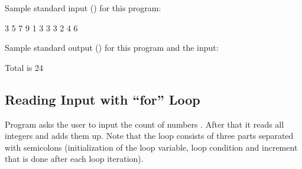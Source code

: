 \documentclass[letterpaper,10pt,english,openany,oneside]{sphinxmanual}
\begin{document}
%
\begin{sphinxVerbatim}[commandchars=\\\{\}]
 
 
 

  
 
     
     
          
            
           
          
     
\end{sphinxVerbatim}
\sphinxresetverbatimhllines

\sphinxAtStartPar
Sample standard input () for this program:

\begin{sphinxVerbatim}[commandchars=\\\{\}]
3 5 7 9 \PYGZhy{}1 3 3 3
2 4 6
\end{sphinxVerbatim}

\sphinxAtStartPar
Sample standard output () for this program and the input:

\begin{sphinxVerbatim}[commandchars=\\\{\}]
Total is 24
\end{sphinxVerbatim}


\subsection{Reading Input with “for” Loop}
\label{\detokenize{constructs-week01:reading-input-with-for-loop}}
\sphinxAtStartPar
Program  asks the user to input the count of numbers .
After that it reads all  integers and adds them up.
Note that the  loop consists of three parts separated with semicolons
(initialization of the loop variable,
loop condition and increment that is done after each loop iteration).
\end{document}
